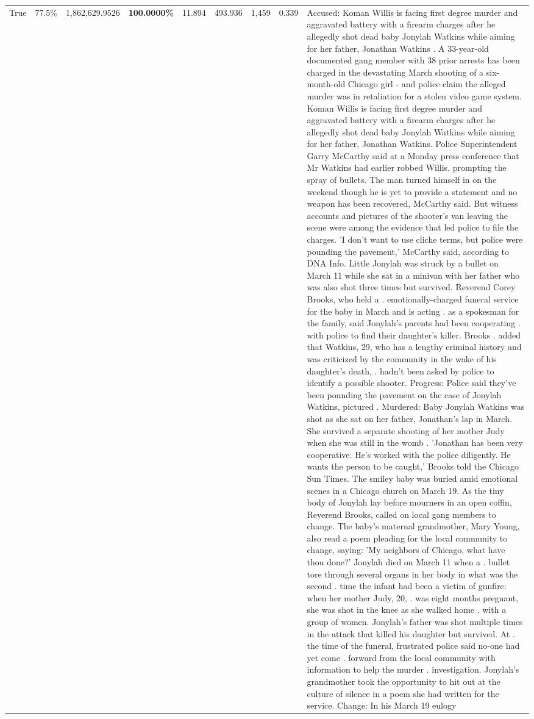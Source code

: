 \begin{table}[H]
\begin{tabular}{lllrlllll}
True & 77.5\% & 1,862,629.9526 & \bfseries \color{red} 100.0000\% & 11.894 & 493.936 & 1,459 & 0.339 & Accused: Koman Willis is facing first degree murder and aggravated battery with a firearm charges after he allegedly shot dead baby Jonylah Watkins while aiming for her father, Jonathan Watkins . A 33-year-old documented gang member with 38 prior arrests has been charged in the devastating March shooting of a six-month-old Chicago girl - and police claim the alleged murder was in retaliation for a stolen video game system. Koman Willis is facing first degree murder and aggravated battery with a firearm charges after he allegedly shot dead baby Jonylah Watkins while aiming for her father, Jonathan Watkins. Police Superintendent Garry McCarthy said at a Monday press conference that Mr Watkins had earlier robbed Willis, prompting the spray of bullets. The man turned himself in on the weekend though he is yet to provide a statement and no weapon has been recovered, McCarthy said. But witness accounts and pictures of the shooter's van leaving the scene were among the evidence that led police to file the charges. 'I don't want to use cliche terms, but police were pounding the pavement,' McCarthy said, according to DNA Info. Little Jonylah was struck by a bullet on March 11 while she sat in a minivan with her father who was also shot three times but survived. Reverend Corey Brooks, who held a . emotionally-charged funeral service for the baby in March and is acting . as a spokesman for the family, said Jonylah's parents had been cooperating . with police to find their daughter's killer. Brooks . added that Watkins, 29, who has a lengthy criminal history and was criticized by the community in the wake of his daughter's death, . hadn't been asked by police to identify a possible shooter. Progress: Police said they've been pounding the pavement on the case of Jonylah Watkins, pictured . Murdered: Baby Jonylah Watkins was shot as she sat on her father, Jonathan's lap in March. She survived a separate shooting of her mother Judy when she was still in the womb . 'Jonathan has been very cooperative. He's worked with the police diligently. He wants the person to be caught,' Brooks told the Chicago Sun Times. The smiley baby was buried amid emotional scenes in a Chicago church on March 19. As the tiny body of Jonylah lay before mourners in an open coffin, Reverend Brooks, called on local gang members to change. The baby's maternal grandmother, Mary Young, also read a poem pleading for the local community to change, saying: 'My neighbors of Chicago, what have thou done?' Jonylah died on March 11 when a . bullet tore through several organs in her body in what was the second . time the infant had been a victim of gunfire: when her mother Judy, 20, . was eight months pregnant, she was shot in the knee as she walked home . with a group of women. Jonylah's father was shot multiple times in the attack that killed his daughter but survived. At . the time of the funeral, frustrated police said no-one had yet come . forward from the local community with information to help the murder . investigation. Jonylah's grandmother took the opportunity to hit out at the culture of silence in a poem she had written for the service. Change: In his March 19 eulogy 
\end{tabular}
\end{table}
